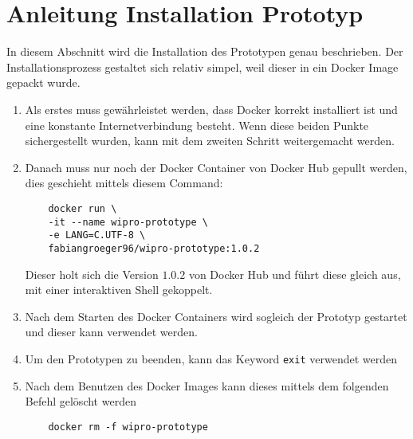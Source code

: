 \chapter{Anleitung Installation Prototyp}
\label{ch:anleitung_proto}
In diesem Abschnitt wird die Installation des Prototypen genau beschrieben. Der Installationsprozess gestaltet sich
relativ simpel, weil dieser in ein Docker Image gepackt wurde.
\newline
\begin{enumerate}
    \item Als erstes muss gewährleistet werden, dass Docker korrekt installiert ist und eine konstante
    Internetverbindung besteht. Wenn diese beiden Punkte sichergestellt wurden, kann mit dem zweiten Schritt
    weitergemacht werden.
    \item Danach muss nur noch der Docker Container von Docker Hub gepullt werden, dies geschieht mittels diesem Command:
    \begin{verbatim}
    docker run \
    -it --name wipro-prototype \
    -e LANG=C.UTF-8 \
    fabiangroeger96/wipro-prototype:1.0.2
    \end{verbatim}
    Dieser holt sich die Version $1.0.2$ von Docker Hub und führt diese gleich aus, mit einer interaktiven Shell
    gekoppelt.
    \item Nach dem Starten des Docker Containers wird sogleich der Prototyp gestartet und dieser kann verwendet werden.
    \item Um den Prototypen zu beenden, kann das Keyword \verb|exit| verwendet werden
    \item Nach dem Benutzen des Docker Images kann dieses mittels dem folgenden Befehl gelöscht werden
    \begin{verbatim}
    docker rm -f wipro-prototype
    \end{verbatim}
\end{enumerate}








